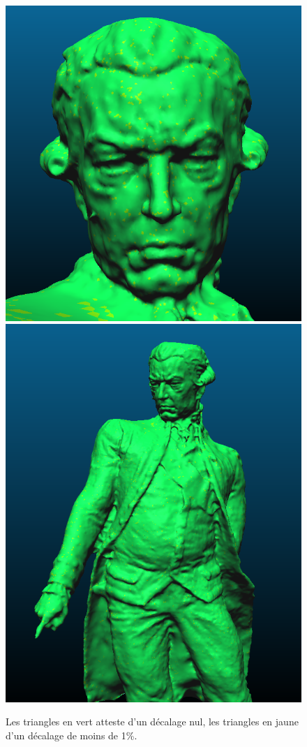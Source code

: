 ﻿\documentclass[12pt, twoside]{article}
\begin{document}
\begin{figure}[h]
\centering
\includegraphics[scale=0.4]{Comparo2.png} \includegraphics[scale=0.4]{Comparo3.png}
\caption{\label{fig:comparo} Les triangles en vert atteste d'un décalage nul, les triangles en jaune d'un décalage de moins de 1\%.}
\end{figure}
\end{document}
